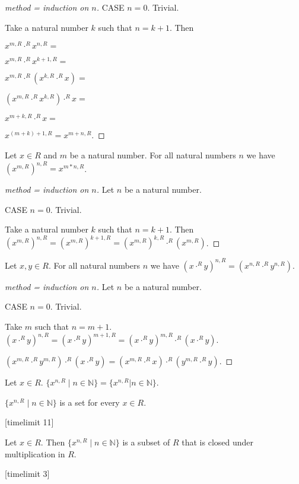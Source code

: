 \documentclass[english,11pt]{article}
\newcommand{\powers}[2]{\{{#1}^{n,#2} \mid n \in \mathbb{N}\}}
\begin{document}
\begin{forthel}
\begin{proof}[method = induction on $n$]
CASE $n = 0$. Trivial.

Take a natural number $k$ such that $n = k + 1$.
Then

$x^{m,R} \cdot^{R} x^{n,R} = $

$x^{m,R} \cdot^{R} x^{k+1,R} = $

$x^{m,R} \cdot^{R} (x^{k,R} \cdot^{R} x) = $

$(x^{m,R} \cdot^{R} x^{k,R}) \cdot^{R} x = $

$x^{m + k,R} \cdot^{R} x = $

$x^{(m + k)+1,R} = x^{m+n,R}.$
\end{proof}

\begin{lemma} Let $x \in R$ and $m$ be a natural number.
For all natural numbers $n$
we have
$(x^{m,R})^{n,R} = x^{m * n,R}$.
\end{lemma}
\begin{proof}[method = induction on $n$]
Let $n$ be a natural number.

CASE $n = 0$. Trivial.

Take a natural number $k$ such that $n = k + 1$. Then
$(x^{m,R})^{n,R} =
(x^{m,R})^{k+1,R} =
(x^{m,R})^{k,R} \cdot^{R} (x^{m,R})$.
\end{proof}

\begin{lemma} Let $x,y \in R$. For all natural numbers
$n$ we have
$(x \cdot^{R} y)^{n,R} = (x^{n,R} \cdot^{R} y^{n,R})$.
\end{lemma}
\begin{proof}[method = induction on $n$]
Let $n$ be a natural number.

CASE $n = 0$. Trivial.

Take $m$ such that $n = m + 1$.
$(x \cdot^{R} y)^{n,R} =
(x \cdot^{R} y)^{m+1,R} =
(x \cdot^{R} y)^{m,R} \cdot^{R} (x \cdot^{R} y).$

$(x^{m,R} \cdot^{R} y^{m,R}) \cdot^{R} (x \cdot^{R} y) =
(x^{m,R} \cdot^{R} x) \cdot^{R} ( y^{m,R} \cdot^{R} y)$.
\end{proof}

\begin{definition} Let $x \in R$. $\powers{x}{R} = \{x^{n,R} | n \in \mathbb{N} \} $.
\end{definition}

\begin{lemma} $\powers{x}{R}$ is a set for every $x \in R$.
\end{lemma}

[timelimit 11]
\begin{lemma} Let $x \in R$. Then
$\powers{x}{R}$ is a subset of $R$ that is closed under multiplication in $R$.
\end{lemma}
[timelimit 3]


\end{forthel}
\end{document}
